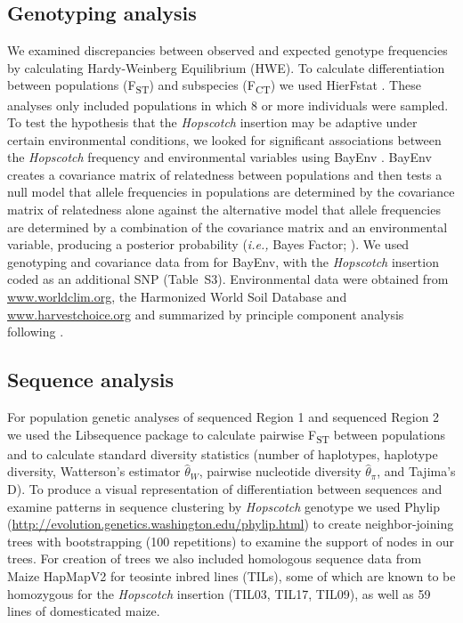 \documentclass[11pt]{article}
\begin{document}
\begin{linenumbers}
\begin{flushleft}
\subsection*{Genotyping analysis}

We examined discrepancies between observed and expected genotype frequencies by calculating Hardy-Weinberg Equilibrium (HWE).  To calculate differentiation between populations (F\textsubscript{ST}) and subspecies (F\textsubscript{CT}) we used HierFstat \citep{Goudet2005}. These analyses only included populations in which 8 or more individuals were sampled. To test the hypothesis that the \emph{Hopscotch} insertion may be adaptive under certain environmental conditions, we looked for significant associations between the \emph{Hopscotch} frequency and environmental variables using BayEnv \citep{Coop2010}. BayEnv creates a covariance matrix of relatedness between populations and then tests a null model that allele frequencies in populations are determined by the covariance matrix of relatedness alone against the alternative model that allele frequencies are determined by a combination of the covariance matrix and an environmental variable, producing a posterior probability (\emph{i.e.,} Bayes Factor; \citealt{Coop2010}). We used genotyping and covariance data from \citet{Pyhajarvi2013} for BayEnv, with the \emph{Hopscotch} insertion coded as an additional SNP (Table~S3). Environmental data were obtained from \url{www.worldclim.org}, the Harmonized World Soil Database \citep{FAOHWSD} and \url{www.harvestchoice.org} and summarized by principle component analysis following \citet{Pyhajarvi2013}.

\subsection*{Sequence analysis}

For population genetic analyses of sequenced Region 1 and sequenced Region 2 we used the  Libsequence package \citep{Thornton2003} to calculate pairwise F\textsubscript{ST} between populations and to calculate standard diversity statistics (number of haplotypes, haplotype diversity, Watterson's estimator $\hat\theta_W$, pairwise nucleotide diversity $\hat\theta_\pi$, and Tajima's D). To produce a visual representation of differentiation between sequences and examine patterns in sequence clustering by \emph{Hopscotch} genotype we used Phylip (\url{http://evolution.genetics.washington.edu/phylip.html}) to create neighbor-joining trees with bootstrapping (100 repetitions) to examine the support of nodes in our trees. For creation of trees we also included homologous sequence data from Maize HapMapV2 \citep{Chia2012} for teosinte inbred lines (TILs), some of which are known to be homozygous for the \emph{Hopscotch} insertion (TIL03, TIL17, TIL09), as well as 59 lines of domesticated maize.


\end{flushleft}
\end{linenumbers}
\end{document}
